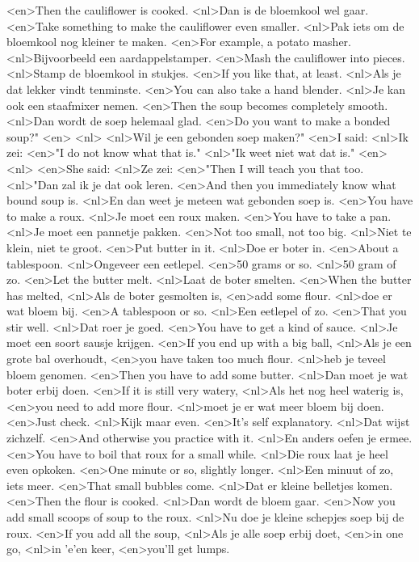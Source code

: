 <en>Then the cauliflower is cooked.
<nl>Dan is de bloemkool wel gaar.
<en>Take something to make the cauliflower even smaller.
<nl>Pak iets om de bloemkool nog kleiner te maken.
<en>For example, a potato masher.
<nl>Bijvoorbeeld een aardappelstamper.
<en>Mash the cauliflower into pieces.
<nl>Stamp de bloemkool in stukjes.
<en>If you like that, at least.
<nl>Als je dat lekker vindt tenminste.
<en>You can also take a hand blender.
<nl>Je kan ook een staafmixer nemen.
<en>Then the soup becomes completely smooth.
<nl>Dan wordt de soep helemaal glad.
<en>Do you want to make a bonded soup?"
<en>
<nl>
<nl>Wil je een gebonden soep maken?"
<en>I said:
<nl>Ik zei:
<en>"I do not know what that is."
<nl>"Ik weet niet wat dat is."
<en>
<nl>
<en>She said:
<nl>Ze zei:
<en>"Then I will teach you that too.
<nl>"Dan zal ik je dat ook leren.
<en>And then you immediately know what bound soup is.
<nl>En dan weet je meteen wat gebonden soep is.
<en>You have to make a roux.
<nl>Je moet een roux maken.
<en>You have to take a pan.
<nl>Je  moet een  pannetje pakken.
<en>Not too small, not too big.
<nl>Niet te klein, niet te groot.
<en>Put butter in it.
<nl>Doe er boter in.
<en>About a tablespoon.
<nl>Ongeveer een eetlepel.
<en>50 grams or so.
<nl>50 gram of zo.
<en>Let the butter melt.
<nl>Laat de boter smelten.
<en>When the butter has melted, 
<nl>Als de boter gesmolten is, 
<en>add some flour.
<nl>doe er wat bloem bij.
<en>A tablespoon or so.
<nl>Een eetlepel of zo.
<en>That you stir well.
<nl>Dat roer je goed.
<en>You have to get a kind of sauce.
<nl>Je moet een soort sausje krijgen.
<en>If you end up with a big ball,
<nl>Als je een grote bal overhoudt,
<en>you have taken too much flour.
<nl>heb je teveel bloem genomen.
<en>Then you have to add some butter.
<nl>Dan moet je wat boter erbij doen.
<en>If it is still very watery, 
<nl>Als het nog heel waterig is, 
<en>you need to add more flour.
<nl>moet je er wat meer bloem bij doen.
<en>Just check.
<nl>Kijk maar even.
<en>It's self explanatory.
<nl>Dat wijst zichzelf.
<en>And otherwise you practice with it.
<nl>En anders oefen je ermee.
<en>You have to  boil that roux for a small while.
<nl>Die roux laat je heel even opkoken.
<en>One minute or so, slightly longer.
<nl>Een minuut of zo, iets meer.
<en>That small bubbles come.
<nl>Dat er kleine belletjes komen.
<en>Then the flour is cooked.
<nl>Dan wordt de bloem gaar.
<en>Now you add small scoops of soup to the roux.
<nl>Nu doe je kleine schepjes soep bij de roux.
<en>If you add all the soup,
<nl>Als je alle soep erbij doet,
<en>in one go,
<nl>in 'e'en keer,
<en>you'll get lumps.
